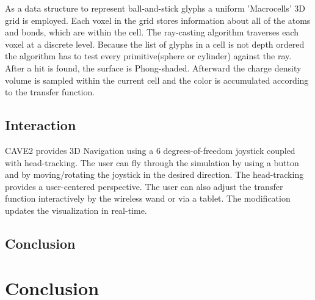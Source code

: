 \documentclass[10pt,twocolumn,letterpaper]{article}
\begin{document}
As a data structure to represent ball-and-stick glyphs a uniform 'Macrocells' 3D grid is employed. Each voxel in the grid stores information about all of the atoms and bonds, which are within the cell. The ray-casting algorithm \cite{Amanatides87afast} traverses each voxel at a discrete level. Because the list of glyphs in a cell is not depth ordered the algorithm has to test every primitive(sphere or cylinder) against the ray. After a hit is found, the surface is Phong-shaded. Afterward the charge density volume is sampled within the current cell and the color is accumulated according to the transfer function.



\subsection{Interaction}
CAVE2 provides 3D Navigation using a 6 degrees-of-freedom joystick coupled with head-tracking. The user can fly through the simulation by using a button and by moving/rotating the joystick in the desired direction. The head-tracking provides a user-centered perspective. The user can also adjust the transfer function interactively by the wireless wand or via a tablet. The modification updates the visualization in real-time.

\subsection{Conclusion}

\section{Conclusion}

{\small


}
\end{document}
